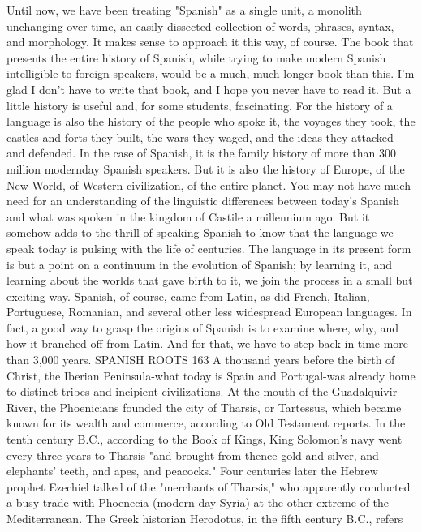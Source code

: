 \documentclass[14pt,a4paper,oneside]{memoir}
\begin{document}
{{{{Until now, we have been treating "Spanish" as a single unit,
a monolith unchanging over time, an easily dissected collection of
words, phrases, syntax, and morphology. It makes sense to approach it
this way, of course. The book that presents the entire history of Spanish, while trying to make modern Spanish intelligible to foreign speakers, would be a much, much longer book than this. I'm glad I don't
have to write that book, and I hope you never have to read it.
But a little history is useful and, for some students, fascinating. For the history of a language is also the history of the people who
spoke it, the voyages they took, the castles and forts they built, the
wars they waged, and the ideas they attacked and defended. In the case
of Spanish, it is the family history of more than 300 million modernday Spanish speakers. But it is also the history of Europe, of the New
World, of Western civilization, of the entire planet.
You may not have much need for an understanding of the linguistic differences between today's Spanish and what was spoken in
the kingdom of Castile a millennium ago. But it somehow adds to the
thrill of speaking Spanish to know that the language we speak today is
pulsing with the life of centuries. The language in its present form is
but a point on a continuum in the evolution of Spanish; by learning it,
and learning about the worlds that gave birth to it, we join the process
in a small but exciting way.
Spanish, of course, came from Latin, as did French, Italian,
Portuguese, Romanian, and several other less widespread European
languages. In fact, a good way to grasp the origins of Spanish is to examine where, why, and how it branched off from Latin. And for that,
we have to step back in time more than 3,000 years.
SPANISH ROOTS 163
A thousand years before the birth of Christ, the Iberian Peninsula-what today is Spain and Portugal-was already home to distinct tribes and incipient civilizations. At the mouth of the Guadalquivir River, the Phoenicians founded the city of Tharsis, or Tartessus,
which became known for its wealth and commerce, according to Old
Testament reports. In the tenth century B.C., according to the Book
of Kings, King Solomon's navy went every three years to Tharsis
"and brought from thence gold and silver, and elephants' teeth, and
apes, and peacocks." Four centuries later the Hebrew prophet Ezechiel
talked of the "merchants of Tharsis," who apparently conducted a
busy trade with Phoenecia (modern-day Syria) at the other extreme of
the Mediterranean.
The Greek historian Herodotus, in the fifth century B.C., refers
}}}}
\end{document}
